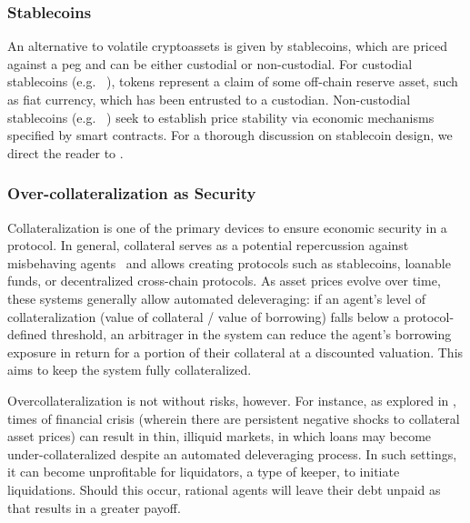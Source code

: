 \subsubsection{Stablecoins}
An alternative to volatile cryptoassets is given by stablecoins, which are priced against a peg and can be either custodial or non-custodial.
For custodial stablecoins (e.g. ~\cite{web:usdc}), tokens represent a claim of some off-chain reserve asset, such as fiat currency, which has been entrusted to a custodian.
Non-custodial stablecoins (e.g. ~\cite{whitepaper:maker}) seek to establish price stability via economic mechanisms specified by smart contracts.
For a thorough discussion on stablecoin design, we direct the reader to \cite{Klages-Mundt2020}.

\subsubsection{Over-collateralization as Security}
Collateralization is one of the primary devices to ensure economic security in a protocol.
In general, collateral serves as a potential repercussion against misbehaving agents~\cite{harz2019balance} and allows creating protocols such as stablecoins, loanable funds, or decentralized cross-chain protocols.
As asset prices evolve over time, these systems generally allow automated deleveraging: if an agent's level of collateralization (value of collateral / value of borrowing) falls below a protocol-defined threshold, an arbitrager in the system can reduce the agent's borrowing exposure in return for a portion of their collateral at a discounted valuation. This aims to keep the system fully collateralized.

Overcollateralization is not without risks, however. For instance, as explored in \cite{gudgeon2020decentralized,kao2020analysis}, times of financial crisis (wherein there are persistent negative shocks to collateral asset prices) can result in thin, illiquid markets, in which loans may become under-collateralized despite an automated deleveraging process.
In such settings, it can become unprofitable for liquidators, a type of keeper, to initiate liquidations.
Should this occur, rational agents will leave their debt unpaid as that results in a greater payoff.
